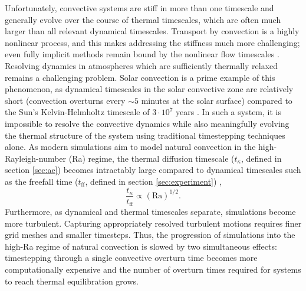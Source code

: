 \documentclass[aps, pre, onecolumn, nofootinbib, notitlepage, groupedaddress, amsfonts, amssymb, amsmath, longbibliography]{revtex4-1}
\begin{document}
Unfortunately, convective systems are stiff in more than one timescale and
generally evolve over the course of thermal
timescales, which are often much larger than all relevant
dynamical timescales. Transport by convection is a highly nonlinear process,
and this makes addressing the stiffness much more challenging; even fully
implicit  methods remain bound by the nonlinear flow timescales
\cite{viallet&all2011, viallet&all2013, viallet&all2016}. 
Resolving dynamics in atmospheres which are sufficiently
thermally relaxed remains a challenging problem.
Solar convection is a prime example of this phenomenon, as
dynamical timescales in the solar convective zone are relatively short 
(convection overturns every $\sim 5$ minutes at the solar surface)
compared to the Sun's Kelvin-Helmholtz timescale of
$3 \cdot 10^7$ years \cite{stix2003}.  
In such a system, it is impossible to resolve the convective dynamics while also
meaningfully evolving the thermal structure of the system using
traditional timestepping techniques alone.
As modern simulations aim to model natural convection
in the high-Rayleigh-number (Ra) regime,
the thermal diffusion timescale ($t_{\kappa}$, defined in section \ref{sec:ae}) 
becomes intractably large compared to dynamical timescales 
such as the freefall time ($t_{\text{ff}}$, defined in section \ref{sec:experiment})
\cite{anders&brown2017}, 
\begin{equation}
\frac{t_{\kappa}}{t_{\text{ff}}} \propto (\text{Ra})^{1/2}.
\end{equation}
Furthermore, as dynamical and thermal timescales separate, 
simulations become more turbulent. Capturing appropriately resolved
turbulent motions requires finer grid meshes and smaller timesteps.
Thus, the progression of simulations into the high-Ra
regime of natural convection is slowed by two simultaneous effects: timestepping
through a single convective overturn time becomes more computationally expensive
and the number of overturn times required for systems to reach thermal equilibration
grows.
\end{document}
